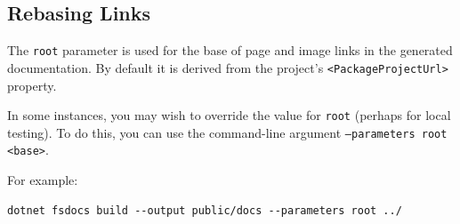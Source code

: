 \documentclass{article}
\begin{document}
\subsection*{Rebasing Links}



The \texttt{root} parameter is used for the base of page and image links in the generated documentation. By default it is derived from the project's \texttt{<PackageProjectUrl>} property.


In some instances, you may wish to override the value for \texttt{root} (perhaps for local testing). To do this, you can use the command-line argument \texttt{--parameters root <base>}.


For example:
\begin{lstlisting}
dotnet fsdocs build --output public/docs --parameters root ../

\end{lstlisting}
\end{document}
